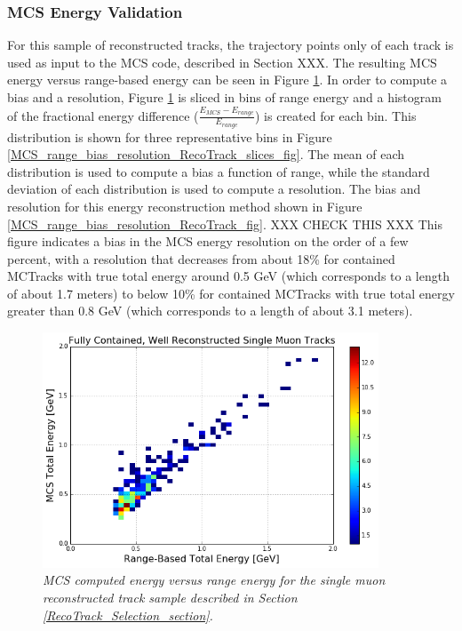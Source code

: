 \subsubsection{MCS Energy Validation}\label{MCS_Energy_Validation_RecoTrack_section}
For this sample of reconstructed tracks, the trajectory points only of each track is used as input to the MCS code, described in Section XXX. The resulting MCS energy versus range-based energy can be seen in Figure \ref{MCS_range_energy_RecoTrack_fig}. In order to compute a bias and a resolution, Figure \ref{MCS_range_energy_RecoTrack_fig} is sliced in bins of range energy and a histogram of the fractional energy difference ($\frac{E_{MCS} - E_{range}}{E_{range}}$) is created for each bin. This distribution is shown for three representative bins in Figure \ref{MCS_range_bias_resolution_RecoTrack_slices_fig}. The mean of each distribution is used to compute a bias a function of range, while the standard deviation of each distribution is used to compute a resolution. The bias and resolution for this energy reconstruction method shown in Figure \ref{MCS_range_bias_resolution_RecoTrack_fig}. XXX CHECK THIS XXX This figure indicates a bias in the MCS energy resolution on the order of a few percent, with a resolution that decreases from about 18\% for contained {\sc MCTracks} with true total energy around 0.5 GeV (which corresponds to a length of about 1.7 meters) to below 10\% for contained {\sc MCTracks} with true total energy greater than 0.8 GeV (which corresponds to a length of about 3.1 meters).


\begin{figure}[h!]
\begin{center}
\includegraphics[width=100mm]{Figures/MCS_range_comparison_RecoTracks.png}
\end{center}
\caption{\textit{MCS computed energy versus range energy for the single muon reconstructed track sample described in Section \ref{RecoTrack_Selection_section}.}}
\label{MCS_range_energy_RecoTrack_fig}
\end{figure}

